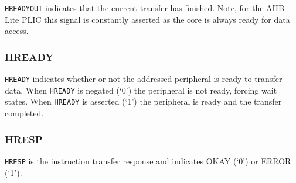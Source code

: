 \texttt{HREADYOUT} indicates that the current transfer has finished.
Note, for the AHB-Lite PLIC this signal is constantly asserted as the
core is always ready for data access.

\subsubsection{HREADY}

\texttt{HREADY} indicates whether or not the addressed peripheral is
ready to transfer data. When \texttt{HREADY} is negated (`0') the
peripheral is not ready, forcing wait states. When \texttt{HREADY} is
asserted (`1') the peripheral is ready and the transfer completed.

\subsubsection{HRESP}

\texttt{HRESP} is the instruction transfer response and indicates OKAY
(`0') or ERROR (`1').
